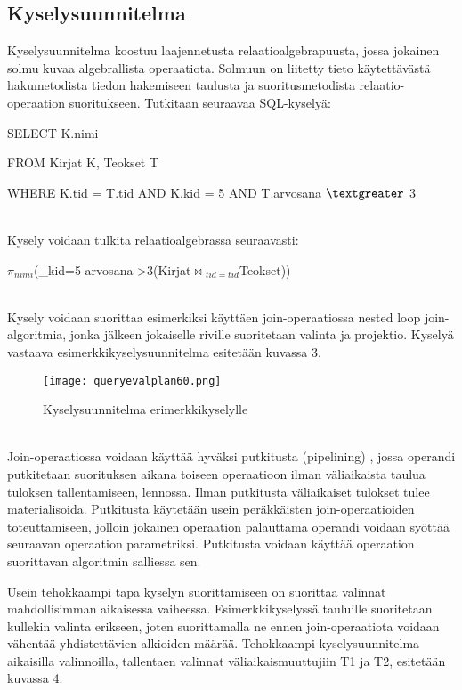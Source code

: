 \documentclass[finnish]{tktltiki2}
\theoremstyle{definition}
\theoremstyle{remark}
\begin{document}
\subsection{Kyselysuunnitelma}
Kyselysuunnitelma koostuu laajennetusta relaatioalgebrapuusta, jossa jokainen solmu kuvaa algebrallista operaatiota. Solmuun on liitetty tieto käytettävästä hakumetodista tiedon hakemiseen taulusta ja suoritusmetodista relaatio-operaation suoritukseen. Tutkitaan seuraavaa SQL-kyselyä:

\begin{frame}

SELECT K.nimi

FROM Kirjat K, Teokset T

WHERE K.tid = T.tid AND K.kid = 5 AND T.arvosana $\textgreater$  3
\end{frame}
\\\newline
Kysely voidaan tulkita relaatioalgebrassa seuraavasti:

\begin{frame}

$\pi$$_{nimi}$(\sigma_{kid=5 \wedge arvosana \textgreater 3}(Kirjat$\Join$$ _{tid=tid}$Teokset))
\end{frame}
\\\newline
Kysely voidaan suorittaa esimerkiksi käyttäen join-operaatiossa nested loop join-algoritmia, jonka jälkeen jokaiselle riville suoritetaan 
valinta ja projektio. Kyselyä vastaava esimerkkikyselysuunnitelma esitetään kuvassa 3.

\begin{figure}[!h] 
  \caption{Kyselysuunnitelma erimerkkikyselylle}
  \centering
    \texttt{[image: queryevalplan60.png]}
\end{figure}
\\\newline
Join-operaatiossa voidaan käyttää hyväksi putkitusta (pipelining) \cite{dalvi2001pipelining}, jossa operandi putkitetaan suorituksen aikana toiseen operaatioon ilman väliaikaista taulua tuloksen tallentamiseen, lennossa. Ilman putkitusta väliaikaiset tulokset tulee materialisoida. Putkitusta käytetään usein peräkkäisten join-operaatioiden toteuttamiseen, jolloin jokainen operaation palauttama operandi voidaan syöttää seuraavan operaation parametriksi. Putkitusta voidaan käyttää operaation suorittavan algoritmin salliessa sen.

Usein tehokkaampi tapa kyselyn suorittamiseen on suorittaa valinnat mahdollisimman aikaisessa vaiheessa. \cite{ramakrishnan2003database} Esimerkkikyselyssä tauluille suoritetaan kullekin valinta erikseen, joten suorittamalla ne ennen join-operaatiota voidaan vähentää yhdistettävien alkioiden määrää. Tehokkaampi kyselysuunnitelma aikaisilla valinnoilla, tallentaen valinnat väliaikaismuuttujiin T1 ja T2, esitetään kuvassa 4.
\end{document}
